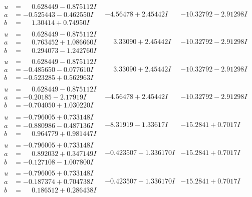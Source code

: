 \documentclass[1p]{elsarticle_modified}
\theoremstyle{definition}
\begin{document}
$$\begin{array}{c|c|c}
\begin{aligned}
u &= \phantom{-}0.628449 - 0.875112 I \\
a &= -0.525443 - 0.462550 I \\
b &= \phantom{-}1.30414 + 0.74950 I\end{aligned}
 & -4.56478 + 2.45442 I & -10.32792 - 2.91298 I \\ \hline\begin{aligned}
u &= \phantom{-}0.628449 - 0.875112 I \\
a &= \phantom{-}0.763452 + 1.086660 I \\
b &= \phantom{-}0.294073 - 1.242760 I\end{aligned}
 & \phantom{-}3.33090 + 2.45442 I & -10.32792 - 2.91298 I \\ \hline\begin{aligned}
u &= \phantom{-}0.628449 - 0.875112 I \\
a &= -0.485650 - 0.077610 I \\
b &= -0.523285 + 0.562963 I\end{aligned}
 & \phantom{-}3.33090 + 2.45442 I & -10.32792 - 2.91298 I \\ \hline\begin{aligned}
u &= \phantom{-}0.628449 - 0.875112 I \\
a &= -0.20185 - 2.17919 I \\
b &= -0.704050 + 1.030220 I\end{aligned}
 & -4.56478 + 2.45442 I & -10.32792 - 2.91298 I \\ \hline\begin{aligned}
u &= -0.796005 + 0.733148 I \\
a &= -0.880986 - 0.487136 I \\
b &= \phantom{-}0.964779 + 0.981447 I\end{aligned}
 & -8.31919 - 1.33617 I & -15.2841 + 0.7017 I \\ \hline\begin{aligned}
u &= -0.796005 + 0.733148 I \\
a &= \phantom{-}0.892032 + 0.347149 I \\
b &= -0.127108 - 1.007800 I\end{aligned}
 & -0.423507 - 1.336170 I & -15.2841 + 0.7017 I \\ \hline\begin{aligned}
u &= -0.796005 + 0.733148 I \\
a &= -0.187374 + 0.704738 I \\
b &= \phantom{-}0.186512 + 0.286438 I\end{aligned}
 & -0.423507 - 1.336170 I & -15.2841 + 0.7017 I \\ \hline\begin{aligned}

\end{aligned}
\end{array}$$
\end{document}
